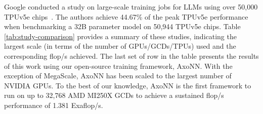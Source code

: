 Google conducted a study on large-scale training jobs for LLMs using over
50,000 TPUv5e chips~\cite{gcloudscaletraining}. The authors achieve 44.67\% of
the peak TPUv5e performance when benchmarking a 32B parameter model on 
50,944 TPUv5e chips.  Table \ref{tab:study-comparison} provides a summary of these
studies, indicating the largest scale (in terms of the number of
GPUs/GCDs/TPUs) used and the corresponding flop/s achieved. The last set of
row in the table presents the results of this work using our open-source
training framework, AxoNN. With the exception of MegaScale, AxoNN has been
scaled to the largest number of NVIDIA GPUs. To the best of our knowledge,
AxoNN is the first framework to run on up to 32,768 AMD MI250X GCDs to achieve
a sustained flop/s performance of 1.381 Exaflop/s.
